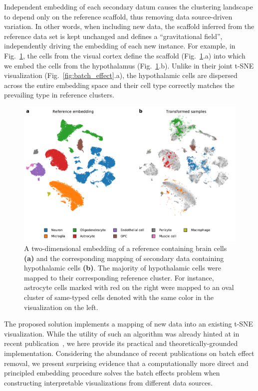 \documentclass[runningheads]{llncs}
\begin{document}
Independent embedding of each secondary datum causes the clustering landscape
to depend only on the reference scaffold, thus removing data source-driven
variation. In other words, when including new data, the scaffold inferred from
the reference data set is kept unchanged and defines a ``gravitational field'',
independently driving the embedding of each new instance. For example, in
Fig.~\ref{fig:transform_brain}, the cells from the visual cortex define the
scaffold (Fig.~\ref{fig:transform_brain}.a) into which we embed the cells from
the hypothalamus (Fig.~\ref{fig:transform_brain}.b). Unlike in their joint
t\nobreakdash -SNE visualization (Fig.~\ref{fig:batch_effect}.a), the
hypothalamic cells are dispersed across the entire embedding space and their
cell type correctly matches the prevailing type in reference clusters.

\begin{figure}[htb]
  \includegraphics[width=\textwidth]{transform_brain.pdf}
  \caption{A two-dimensional embedding of a reference containing brain cells
  \textbf{(a)} and the corresponding mapping of secondary data containing hypothalamic
  cells \textbf{(b)}.  The majority of hypothalamic cells were mapped to their
  corresponding reference cluster. For instance, astrocyte cells marked with
  red on the right were mapped to an oval cluster of same-typed cells denoted
  with the same color in the visualization on the left.}
  \label{fig:transform_brain}
\end{figure}

The proposed solution implements a mapping of new data into an existing t-SNE
visualization. While the utility of such an algorithm was already hinted at in
recent publication~\cite{Kobak2019}, we here provide its practical and
theoretically-grounded implementation. Considering the abundance of recent
publications on batch effect removal, we present surprising evidence that a
computationally more direct and principled embedding procedure solves the batch
effects problem when constructing interpretable visualizations from different
data sources.
\end{document}
